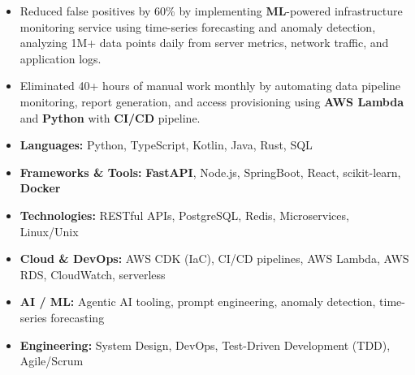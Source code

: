 \documentclass[10pt,a4paper]{article}
\begin{document}
\begin{itemize}[topsep=0pt]
  \item Reduced false positives by 60\% by implementing \textbf{ML}-powered infrastructure monitoring service using time-series forecasting and anomaly detection, analyzing 1M+ data points daily from server metrics, network traffic, and application logs.
  \item Eliminated 40+ hours of manual work monthly by automating data pipeline monitoring, report generation, and access provisioning using \textbf{AWS Lambda} and \textbf{Python} with \textbf{CI/CD} pipeline.
\end{itemize}
\vspace{0.15em}


\vspace{0.15em}

\begin{itemize}[leftmargin=16pt,topsep=0pt,itemsep=0.6pt]
  \item \textbf{Languages:} Python, TypeScript, Kotlin, Java, Rust, SQL
  \item \textbf{Frameworks \& Tools:} \textbf{FastAPI}, Node.js, SpringBoot, React, scikit-learn, \textbf{Docker}
  \item \textbf{Technologies:} RESTful APIs, PostgreSQL, Redis, Microservices, Linux/Unix
  \item \textbf{Cloud \& DevOps:} AWS CDK (IaC), CI/CD pipelines, AWS Lambda, AWS RDS, CloudWatch, serverless
  \item \textbf{AI / ML:} Agentic AI tooling, prompt engineering, anomaly detection, time-series forecasting
  \item \textbf{Engineering:} System Design, DevOps, Test-Driven Development (TDD), Agile/Scrum
\end{itemize}
\vspace{0.15em}




\end{document}
